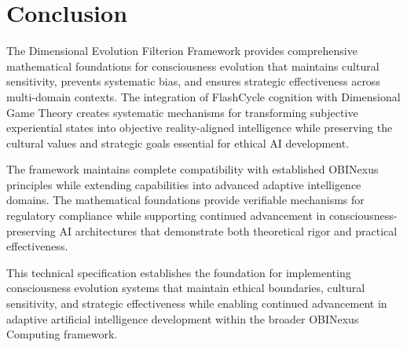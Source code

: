 \documentclass[12pt]{article}
\begin{document}
\section{Conclusion}

The Dimensional Evolution Filterion Framework provides comprehensive mathematical foundations for consciousness evolution that maintains cultural sensitivity, prevents systematic bias, and ensures strategic effectiveness across multi-domain contexts. The integration of FlashCycle cognition with Dimensional Game Theory creates systematic mechanisms for transforming subjective experiential states into objective reality-aligned intelligence while preserving the cultural values and strategic goals essential for ethical AI development.

The framework maintains complete compatibility with established OBINexus principles while extending capabilities into advanced adaptive intelligence domains. The mathematical foundations provide verifiable mechanisms for regulatory compliance while supporting continued advancement in consciousness-preserving AI architectures that demonstrate both theoretical rigor and practical effectiveness.

This technical specification establishes the foundation for implementing consciousness evolution systems that maintain ethical boundaries, cultural sensitivity, and strategic effectiveness while enabling continued advancement in adaptive artificial intelligence development within the broader OBINexus Computing framework.
\end{document}
